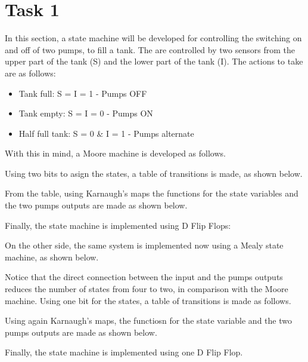 


\section*{Task 1}

In this section, a state machine will be 
developed for controlling the switching
on and off of two pumps, to fill a tank.
The are controlled by two sensors from 
the upper part of the tank (S) and the 
lower part of the tank (I). The actions
to take are as follows:

\begin{itemize}
    \item Tank full: S = I = 1 - Pumps OFF
    \item Tank empty: S = I = 0 - Pumps ON
    \item Half full tank: S = 0 \& I = 1 - Pumps alternate 
\end{itemize}

With this in mind, a Moore machine is 
developed as follows.


Using two bits to asign the states, a table 
of transitions is made, as shown below.


From the table, using Karnaugh's maps the 
functions for the state variables and the 
two pumps outputs are made as shown below.


Finally, the state machine is implemented using 
D Flip Flops:


On the other side, the same system is implemented 
now using a Mealy state machine, as shown below.


Notice that the direct connection between the 
input and the pumps outputs reduces the number 
of states from four to two, in comparison with 
the Moore machine.
Using one bit for the states, a table of transitions
is made as follows.


Using again Karnaugh's maps, the functiosn for
the state variable and the two pumps outputs are
made as shown below.


Finally, the state machine is implemented using
one D Flip Flop.



